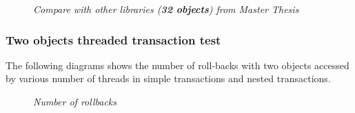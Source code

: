 \documentclass[12pt]{article}
\begin{document}
\begin{figure}[h!]
    \centering
    \qquad
    \caption*{\textit{\color{gray}Compare with other libraries (\textbf{32 objects}) from Master Thesis\cite{Performance}}}
    \label{fig:example}
\end{figure}
 
\newpage
\subsubsection{Two objects threaded transaction test}
The following diagrams shows the number of roll-backs with two objects accessed by various number of threads in simple transactions and nested transactions.

\begin{figure}[h!]%
    \centering
    \qquad
    \caption*{\textit{\color{gray}Number of rollbacks}}%
    \label{fig:example}%
\end{figure}
\end{document}
